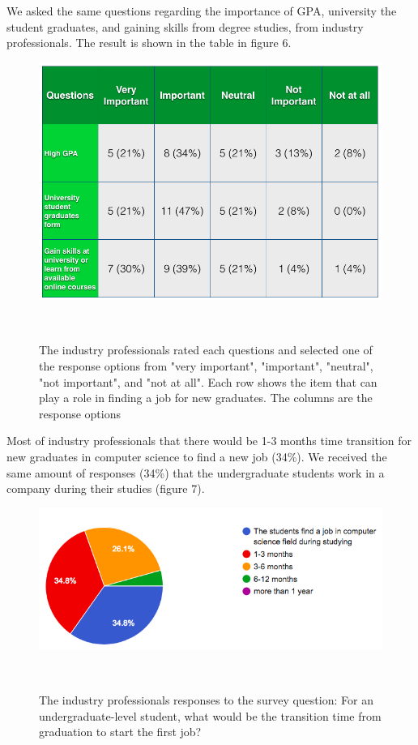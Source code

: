 \documentclass{sigchi}
\begin{document}
We asked the same questions regarding the importance of GPA, university the student graduates, and gaining skills from degree studies, from industry professionals. The result is shown in the table in figure 6.
 
\begin{figure}
\centering
  \includegraphics[width=1.05\columnwidth]{figures/important_notimportant_table_i}
  \caption{The industry professionals rated each questions and selected one of the response options from "very important", "important", "neutral", "not important", and "not at all". Each row shows the item that can play a role in finding a job for new graduates. The columns are the response options}~\label{fig:figure6}
\end{figure}

Most of industry professionals that there would be 1-3 months time transition for new graduates in computer science to find a new job (34\%). We received the same amount of responses (34\%) that the undergraduate students work in a company during their studies (figure 7).

\begin{figure}
\centering
  \includegraphics[width=1.05\columnwidth]{figures/transition_time_i}
  \caption{The industry professionals responses to the survey question: For an undergraduate-level student, what would be the transition time from graduation to start the first job? }~\label{fig:figure7}
\end{figure}
\end{document}
